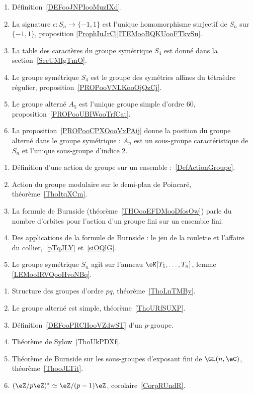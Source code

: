 \begin{enumerate}
    \item
        Définition~\ref{DEFooJNPIooMuzIXd}.
    \item
        La signature \( \epsilon\colon S_n\to \{ -1,1 \}\) est l'unique homomorphisme surjectif de \( S_n\) sur \( \{ -1,1 \}\), proposition \ref{ProphIuJrC}\ref{ITEMooBQKUooFTkvSu}.
    \item
        La table des caractères du groupe symétrique \( S_4\) est donné dans la section~\ref{SecUMIgTmO}.
    \item
        Le groupe symétrique \( S_4\) est le groupe des symétries affines du tétraèdre régulier, proposition~\ref{PROPooVNLKooOjQzCj}.
    \item
        Le groupe alterné \( A_5\) est l'unique groupe simple d'ordre \( 60\), proposition~\ref{PROPooUBIWooTrfCat}.
    \item
        La proposition~\ref{PROPooCPXOooVxPAij} donne la position du groupe alterné dans le groupe symétrique : \( A_n\) est un sous-groupe caractéristique de \( S_n\) et l'unique sous-groupe d'indice \( 2\).
\end{enumerate}

    \label{THEMEooKZHBooRCULcr}
    \begin{enumerate}
        \item Définition d'une action de groupe sur un ensemble :~\ref{DefActionGroupe}.
    \item Action du groupe modulaire sur le demi-plan de Poincaré, théorème~\ref{ThoItqXCm}.
    \item
        La formule de Burnside (théorème~\ref{THOooEFDMooDfosOw}) parle du nombre d'orbites pour l'action d'un groupe fini sur un ensemble fini.
    \item Des applications de la formule de Burnside : le jeu de la roulette et l'affaire du collier,~\ref{pTqJLY} et~\ref{siOQlG}.
    \item
        
        Le groupe symétrique  \( S_n\) agit sur l'anneau  \( \eK[T_1,\ldots, T_n]\), lemme \ref{LEMooIRVQooHvoNBq}.

    \end{enumerate}


\begin{enumerate}
    \item Structure des groupes d'ordre \( pq\), théorème~\ref{ThoLnTMBy}.
    \item Le groupe alterné est simple, théorème~\ref{ThoURfSUXP}.
    \item Définition~\ref{DEFooPRCHooVZdwST} d'un \( p\)-groupe.
    \item Théorème de Sylow~\ref{ThoUkPDXf}.
    \item Théorème de Burnside sur les sous-groupes d'exposant fini de \( \GL(n,\eC)\), théorème~\ref{ThooJLTit}.
    \item \( (\eZ/p\eZ)^*\simeq \eZ/(p-1)\eZ\), corolaire~\ref{CorpRUndR}.
\end{enumerate}



